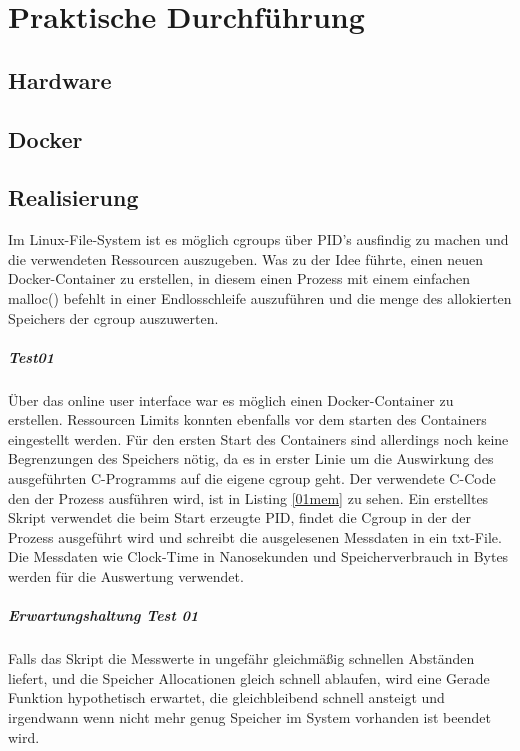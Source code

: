 \thispagestyle{empty}
\section{Praktische Durchführung}
\subsection{Hardware}
\subsection{Docker}
\subsection{Realisierung}
Im Linux-File-System ist es möglich cgroups über PID's ausfindig zu machen und die verwendeten Ressourcen auszugeben. Was zu der Idee führte, einen neuen Docker-Container zu erstellen, in diesem einen Prozess mit einem einfachen malloc() befehlt in einer Endlosschleife auszuführen und die menge des allokierten Speichers der cgroup auszuwerten. 

\subparagraph{Test01}
Über das online user interface war es möglich einen Docker-Container zu erstellen. Ressourcen Limits konnten ebenfalls vor dem starten des Containers eingestellt werden. Für den ersten Start des Containers sind allerdings noch keine Begrenzungen des Speichers nötig, da es in erster Linie um die Auswirkung des ausgeführten C-Programms auf die eigene cgroup geht. Der verwendete C-Code den der Prozess ausführen wird, ist in Listing \ref{01mem} zu sehen. Ein erstelltes Skript verwendet die beim Start erzeugte PID, findet die Cgroup in der der Prozess ausgeführt wird und schreibt die ausgelesenen Messdaten in ein txt-File. Die Messdaten wie Clock-Time in Nanosekunden und Speicherverbrauch in Bytes werden für die Auswertung verwendet.

\vspace{1em}


\subparagraph{Erwartungshaltung Test 01}
Falls das Skript die Messwerte in ungefähr gleichmäßig schnellen Abständen liefert, und die Speicher Allocationen gleich schnell ablaufen, wird eine Gerade Funktion hypothetisch erwartet, die gleichbleibend schnell ansteigt und irgendwann wenn nicht mehr genug Speicher im System vorhanden ist beendet wird.

